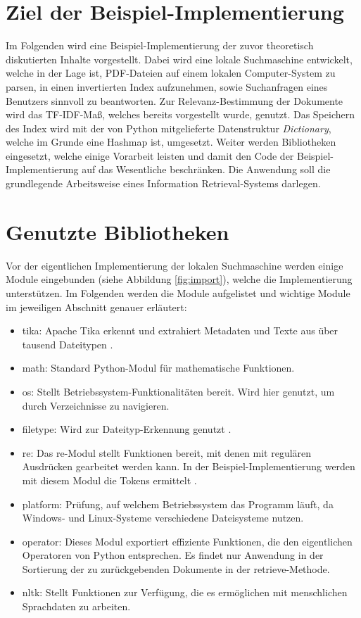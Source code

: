 \section{Ziel der Beispiel-Implementierung}\label{ziel-der-beispiel-implementierung}

Im Folgenden wird eine Beispiel-Implementierung der zuvor theoretisch diskutierten Inhalte vorgestellt. Dabei wird eine lokale Suchmaschine entwickelt, welche in der Lage ist, PDF-Dateien auf einem lokalen Computer-System zu parsen, in einen invertierten Index aufzunehmen, sowie Suchanfragen eines Benutzers sinnvoll zu beantworten. Zur Relevanz-Bestimmung der Dokumente wird das TF-IDF-Maß, welches bereits vorgestellt wurde, genutzt. Das Speichern des Index wird mit der von Python mitgelieferte Datenstruktur \textit{Dictionary}, welche im Grunde eine Hashmap ist, umgesetzt. Weiter werden Bibliotheken eingesetzt, welche einige Vorarbeit leisten und damit den Code der Beispiel-Implementierung auf das Wesentliche beschränken. Die Anwendung soll die grundlegende Arbeitsweise eines Information Retrieval-Systems darlegen.

\section{Genutzte Bibliotheken}\label{genutzte-bibliotheken}

Vor der eigentlichen Implementierung der lokalen Suchmaschine werden einige Module eingebunden (siehe Abbildung \ref{fig:import}), welche die Implementierung unterstützen. Im Folgenden werden die Module aufgelistet und wichtige Module im jeweiligen Abschnitt genauer erläutert:\newpage
\begin{itemize}
	\item tika: Apache Tika erkennt und extrahiert Metadaten und Texte aus über tausend Dateitypen \cite{Apache_Tika}.
	\item math: Standard Python-Modul für mathematische Funktionen.
	\item os: Stellt Betriebssystem-Funktionalitäten bereit. Wird hier genutzt, um durch Verzeichnisse zu navigieren.
	\item filetype: Wird zur Dateityp-Erkennung genutzt \cite{filetype}.
	\item re: Das re-Modul stellt Funktionen bereit, mit denen mit regulären Ausdrücken gearbeitet werden kann. In der Beispiel-Implementierung werden mit diesem Modul die Tokens ermittelt \cite{re}.
	\item platform: Prüfung, auf welchem Betriebssystem das Programm läuft, da Windows- und Linux-Systeme verschiedene Dateisysteme nutzen.
	\item operator: Dieses Modul exportiert effiziente Funktionen, die den eigentlichen Operatoren von Python entsprechen. Es findet nur Anwendung in der Sortierung der zu zurückgebenden Dokumente in der retrieve-Methode.
	\item nltk: Stellt Funktionen zur Verfügung, die es ermöglichen mit menschlichen Sprachdaten zu arbeiten.
\end{itemize}

